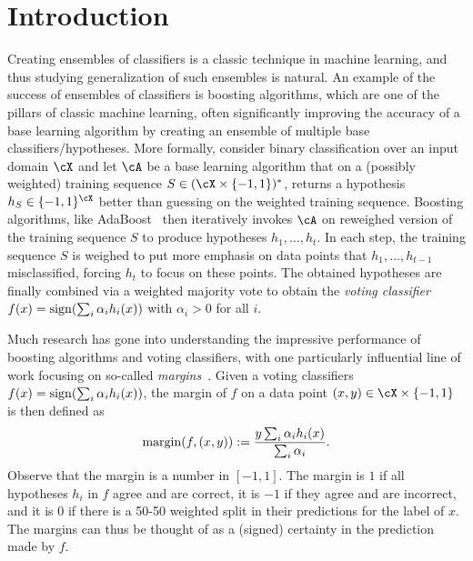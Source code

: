 
\section{Introduction}
Creating ensembles of classifiers is a classic technique in machine learning, and thus studying generalization of such ensembles is natural. An example of the success of ensembles of classifiers is boosting algorithms, which are one of the pillars of classic machine
learning, often significantly improving the accuracy of a base
learning algorithm by creating an ensemble of multiple base
classifiers/hypotheses. More formally, consider binary classification over an
input domain $\cX$ and let $\cA$ be a base learning algorithm that on a
(possibly weighted) training sequence $S \in (\cX \times \{-1,1\})^*$, returns a hypothesis
$h_S \in \{-1,1\}^{\cX}$ better than guessing on the weighted training sequence. Boosting algorithms, like AdaBoost~\cite{adaboostyoavfreund}
then iteratively invokes $\cA$ on reweighed version of the training sequence
$S$ to produce hypotheses $h_1,\dots,h_t$. In each step, the training
sequence $S$ is weighed to put more emphasis on data points that
$h_1,\dots,h_{t-1}$ misclassified, forcing $h_t$ to focus on these
points. The obtained hypotheses are finally combined
via a weighted majority vote to obtain the \emph{voting classifier} $f(x) =
\operatorname{\mathrm{sign}}(\sum_i \alpha_i h_i(x))$ with $\alpha_i >0$ for all $i$.

Much research has gone into understanding the impressive performance
of boosting algorithms and voting classifiers, with one particularly influential line of work
focusing on so-called \emph{margins}~\cite{Schapire19981651}. Given a
voting classifiers
$f(x)=\operatorname{\mathrm{sign}}(\sum_i \alpha_i h_i(x))$, the margin of $f$ on a data point $(x,y) \in \cX
\times \{-1,1\}$ is then defined as
\[
  \operatorname{margin}(f,(x,y)):=\frac{y \sum_i \alpha_i h_i(x)}{\sum_i \alpha_i}.
\]
Observe that the margin is a number in $[-1,1]$. The margin is $1$ if
all hypotheses $h_i$ in $f$ agree and are correct, it is $-1$ if they
agree and are incorrect, and it is $0$ if there is a 50-50 weighted split in
their predictions for the label of $x$. The margins can thus be
thought of as a (signed) certainty in the prediction made by $f$.

